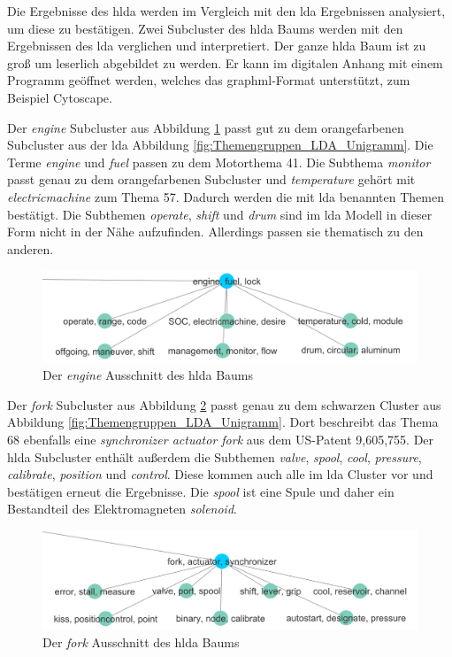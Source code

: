 Die Ergebnisse des \gls{hlda} werden im Vergleich mit den \gls{lda} Ergebnissen analysiert, um diese zu bestätigen. Zwei Subcluster des \gls{hlda} Baums werden mit den Ergebnissen des \gls{lda} verglichen und interpretiert. Der ganze \gls{hlda} Baum ist zu groß um leserlich abgebildet zu werden. Er kann im digitalen Anhang mit einem Programm geöffnet werden, welches das graphml-Format unterstützt, zum Beispiel Cytoscape.


Der \emph{engine} Subcluster aus Abbildung \ref{fig:hlda_engine} passt gut zu dem orangefarbenen Subcluster aus der \gls{lda} Abbildung \ref{fig:Themengruppen_LDA_Unigramm}. Die Terme \emph{engine} und \emph{fuel} passen zu dem Motorthema 41. Die Subthema \emph{monitor} passt genau zu dem orangefarbenen Subcluster und \emph{temperature} gehört mit \emph{electricmachine} zum Thema 57. Dadurch werden die mit \gls{lda} benannten Themen bestätigt. Die Subthemen \emph{operate}, \emph{shift} und \emph{drum} sind im \gls{lda} Modell in dieser Form nicht in der Nähe aufzufinden. Allerdings passen sie thematisch zu den anderen.

\begin{figure}[htpb]
	\centering
	\includegraphics[width=\textwidth,keepaspectratio=true]{img/hldaEngine.png}
	\caption{
		Der \emph{engine} Ausschnitt des \gls{hlda} Baums
	}
	\label{fig:hlda_engine}
\end{figure}

Der \emph{fork} Subcluster aus Abbildung \ref{fig:hlda_fork} passt genau zu dem schwarzen Cluster aus Abbildung \ref{fig:Themengruppen_LDA_Unigramm}. Dort beschreibt das Thema 68 ebenfalls eine \emph{synchronizer actuator fork} aus dem US-Patent 9,605,755. Der \gls{hlda} Subcluster enthält außerdem die Subthemen \emph{valve}, \emph{spool}, \emph{cool}, \emph{pressure}, \emph{calibrate}, \emph{position} und \emph{control}. Diese kommen auch alle im \gls{lda} Cluster vor und bestätigen erneut die Ergebnisse. Die \emph{spool} ist eine Spule und daher ein Bestandteil des Elektromagneten \emph{solenoid}.

\begin{figure}[htpb]
	\centering
	\includegraphics[width=\textwidth,keepaspectratio=true]{img/hldaFork.png}
	\caption{
		Der \emph{fork} Ausschnitt des \gls{hlda} Baums
	}
	\label{fig:hlda_fork}
\end{figure}

